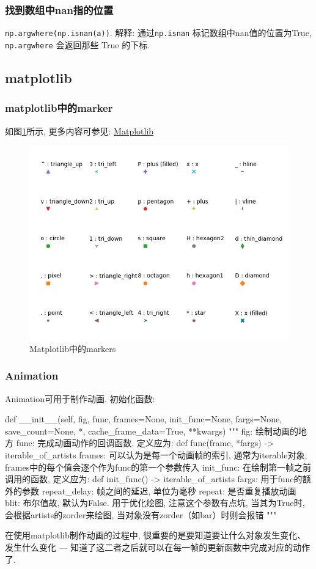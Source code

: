 \subsubsection{找到数组中nan指的位置}
\texttt{np.argwhere(np.isnan(a))}. 解释: 通过\texttt{np.isnan} 标记数组中nan值的位置为True, \texttt{np.argwhere} 会返回那些 True 的下标. 


\subsection{matplotlib}
\subsubsection{matplotlib中的marker}如图\ref{fig:matplotlib-markers}所示, 更多内容可参见: \href{https://matplotlib.org/api/_as_gen/matplotlib.pyplot.plot.html#matplotlib.pyplot.plot}{Matplotlib}
\begin{figure}[h]
	\centering
	\includegraphics[width=.65\textwidth]{pics/markers.png}
	\caption{Matplotlib中的markers}
	\label{fig:matplotlib-markers}
\end{figure}

\subsubsection{Animation}
Animation可用于制作动画. 初始化函数: 
\begin{python}
	def __init__(self, fig, func, frames=None, init_func=None, fargs=None,
	save_count=None, *, cache_frame_data=True, **kwargs)
	"""
	fig: 绘制动画的地方
	func: 完成动画动作的回调函数. 定义应为: def func(frame, *fargs) -> iterable_of_artists
	frames: 可以认为是每一个动画帧的索引, 通常为iterable对象, frames中的每个值会逐个作为func的第一个参数传入
	init_func: 在绘制第一帧之前调用的函数, 定义应为: def init_func() -> iterable_of_artists
	fargs: 用于func的额外的参数
	repeat_delay: 帧之间的延迟, 单位为毫秒
	repeat: 是否重复播放动画
	blit: 布尔值故,  默认为False. 用于优化绘图, 注意这个参数有点坑, 当其为True时, 会根据artists的zorder来绘图, 当对象没有zorder（如bar）时则会报错
	"""
\end{python}
在使用matplotlib制作动画的过程中, 很重要的是要知道要让什么对象发生变化、发生什么变化 --- 知道了这二者之后就可以在每一帧的更新函数中完成对应的动作了. 

